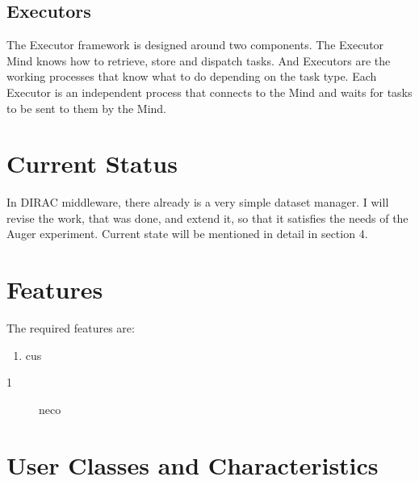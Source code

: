 \documentclass{scrreprt}
\begin{document}
\subsection{Executors}
The Executor framework is designed around two components. The Executor Mind knows how to retrieve, store and dispatch tasks. And Executors are the working processes that know what to do depending on the task type. Each Executor is an independent process that connects to the Mind and waits for tasks to be sent to them by the Mind.

\section{Current Status}

In DIRAC middleware, there already is a very simple dataset manager. I will revise the work, that was done, and extend it, so that it satisfies the needs of the Auger experiment. Current state will be mentioned in detail in section 4. 

\section{Features}

The required features are:

\begin{enumerate}
\item cus
\end{enumerate}

\begin{description}
\item[1] neco
\end{description}


\section{User Classes and Characteristics}
\end{document}
